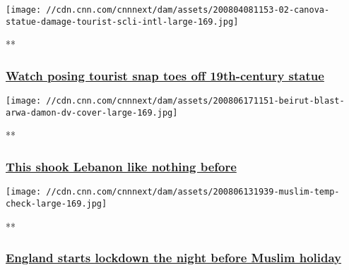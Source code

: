 \href{/videos/arts/2020/08/04/tourist-breaks-statue-italy-orig-mrg.cnn/video/playlists/around-the-world/}{}

\texttt{[image: //cdn.cnn.com/cnnnext/dam/assets/200804081153-02-canova-statue-damage-tourist-scli-intl-large-169.jpg]}

**

\hypertarget{watch-posing-tourist-snap-toes-off-19th-century-statue}{%
\subsubsection{\texorpdfstring{\href{/videos/arts/2020/08/04/tourist-breaks-statue-italy-orig-mrg.cnn/video/playlists/around-the-world/}{Watch
posing tourist snap toes off 19th-century
statue}}{Watch posing tourist snap toes off 19th-century statue}}\label{watch-posing-tourist-snap-toes-off-19th-century-statue}}

\href{/videos/world/2020/08/06/beirut-explosion-arwa-damon-lon-orig.cnn/video/playlists/around-the-world/}{}

\texttt{[image: //cdn.cnn.com/cnnnext/dam/assets/200806171151-beirut-blast-arwa-damon-dv-cover-large-169.jpg]}

**

\hypertarget{this-shook-lebanon-like-nothing-before}{%
\subsubsection{\texorpdfstring{\href{/videos/world/2020/08/06/beirut-explosion-arwa-damon-lon-orig.cnn/video/playlists/around-the-world/}{This
shook Lebanon like nothing
before}}{This shook Lebanon like nothing before}}\label{this-shook-lebanon-like-nothing-before}}

\href{/videos/world/2020/08/06/england-lockdown-on-eid-eve-muslims-veselinovic-vpx.cnn/video/playlists/around-the-world/}{}

\texttt{[image: //cdn.cnn.com/cnnnext/dam/assets/200806131939-muslim-temp-check-large-169.jpg]}

**

\hypertarget{england-starts-lockdown-the-night-before-muslim-holiday}{%
\subsubsection{\texorpdfstring{\href{/videos/world/2020/08/06/england-lockdown-on-eid-eve-muslims-veselinovic-vpx.cnn/video/playlists/around-the-world/}{England
starts lockdown the night before Muslim
holiday}}{England starts lockdown the night before Muslim holiday}}\label{england-starts-lockdown-the-night-before-muslim-holiday}}

